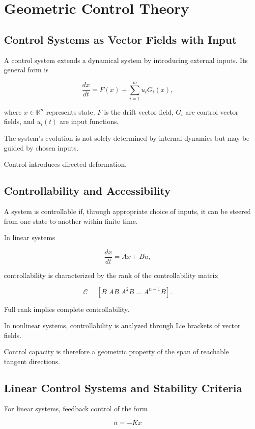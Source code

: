 \documentclass[12pt]{book}
\begin{document}
\chapter{Geometric Control Theory}

\section{Control Systems as Vector Fields with Input}

A control system extends a dynamical system by introducing external inputs. Its general form is

\[
\frac{dx}{dt} = F(x) + \sum_{i=1}^m u_i G_i(x),
\]

where $x \in \mathbb{R}^n$ represents state, $F$ is the drift vector field, $G_i$ are control vector fields, and $u_i(t)$ are input functions.

The system's evolution is not solely determined by internal dynamics but may be guided by chosen inputs.

Control introduces directed deformation.

\section{Controllability and Accessibility}

A system is controllable if, through appropriate choice of inputs, it can be steered from one state to another within finite time.

In linear systems

\[
\frac{dx}{dt} = Ax + Bu,
\]

controllability is characterized by the rank of the controllability matrix

\[
\mathcal{C} = [B \; AB \; A^2B \; \dots \; A^{n-1}B].
\]

Full rank implies complete controllability.

In nonlinear systems, controllability is analyzed through Lie brackets of vector fields.

Control capacity is therefore a geometric property of the span of reachable tangent directions.

\section{Linear Control Systems and Stability Criteria}

For linear systems, feedback control of the form

\[
u = -Kx
\]
\end{document}
